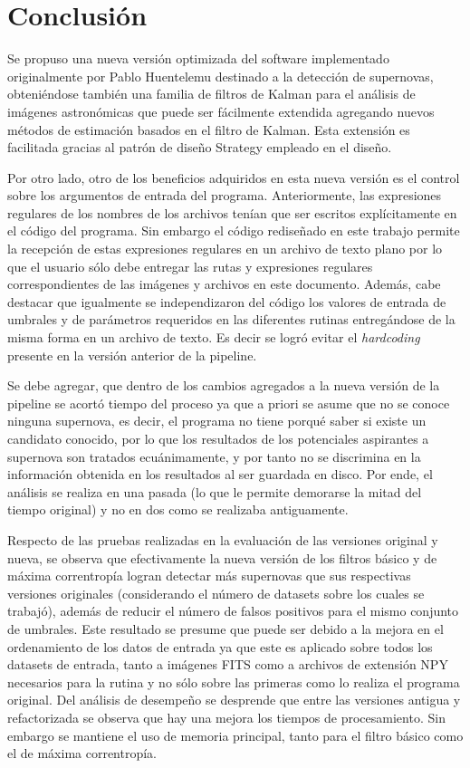 \chapter{Conclusi\'on}
\label{ch:conclusion}

Se propuso una nueva versi\'on optimizada del software implementado originalmente por Pablo Huentelemu destinado a la detecci\'on de supernovas, obteni\'endose tambi\'en una familia de filtros de Kalman para el an\'alisis de im\'agenes astron\'omicas que puede ser f\'acilmente extendida agregando nuevos m\'etodos de estimaci\'on basados en el filtro de Kalman. Esta extensi\'on es facilitada gracias al patr\'on de dise\~no Strategy empleado en el dise\~no.
\bigskip

Por otro lado, otro de los beneficios adquiridos en esta nueva versi\'on es el control sobre los argumentos de entrada del programa. Anteriormente, las expresiones regulares de los nombres de los archivos ten\'ian que ser escritos expl\'icitamente en el c\'odigo del programa. Sin embargo el c\'odigo redise\~nado en este trabajo permite la recepci\'on de estas expresiones regulares en un archivo de texto plano por lo que el usuario s\'olo debe entregar las rutas y expresiones regulares correspondientes de las im\'agenes y archivos en este documento. Adem\'as, cabe destacar que igualmente se independizaron del c\'odigo los valores de entrada de umbrales y de par\'ametros requeridos en las diferentes rutinas entreg\'andose de la misma forma en un archivo de texto. Es decir se logr\'o evitar el \textit{hardcoding} presente en la versi\'on anterior de la pipeline.
\bigskip

Se debe agregar, que dentro de los cambios agregados a la nueva versi\'on de la pipeline se acort\'o tiempo del proceso ya que a priori se asume que no se conoce ninguna supernova, es decir, el programa no tiene porqu\'e saber si existe un candidato conocido, por lo que los resultados de los potenciales aspirantes a supernova son tratados ecu\'animamente, y por tanto no se discrimina en la informaci\'on obtenida en los resultados al ser guardada en disco. Por ende, el an\'alisis se realiza en una pasada (lo que le permite demorarse la mitad del tiempo original) y no en dos como se realizaba antiguamente.
\bigskip

Respecto de las pruebas realizadas en la evaluaci\'on de las versiones original y nueva, se observa que efectivamente la nueva versi\'on de los filtros b\'asico y de m\'axima correntrop\'ia logran detectar m\'as supernovas que sus respectivas versiones originales (considerando el n\'umero de datasets sobre los cuales se trabaj\'o), adem\'as de reducir el n\'umero de falsos positivos para el mismo conjunto de umbrales. Este resultado se presume que puede ser debido a la mejora en el ordenamiento de los datos de entrada ya que este es aplicado sobre todos los datasets de entrada, tanto a im\'agenes FITS como a archivos de extensi\'on NPY necesarios para la rutina y no s\'olo sobre las primeras como lo realiza el programa original. Del an\'alisis de desempe\~no se desprende que entre las versiones antigua y refactorizada se observa que hay una mejora los tiempos de procesamiento. Sin embargo se mantiene el uso de memoria principal, tanto para el filtro b\'asico como el de m\'axima correntrop\'ia. 
\bigskip


